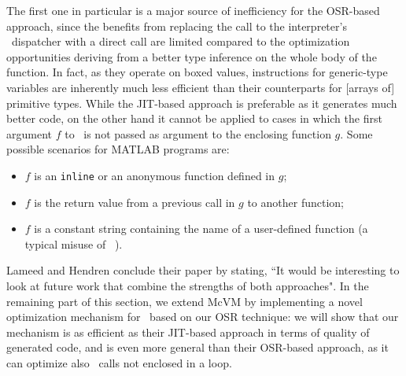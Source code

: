 The first one in particular is a major source of inefficiency for the OSR-based approach, since the benefits from replacing the call to the interpreter's \feval\ dispatcher with a direct call are limited compared to the optimization opportunities deriving from a better type inference on the whole body of the function. In fact, as they operate on boxed values, instructions for generic-type variables are inherently much less efficient than their counterparts for [arrays of] primitive types. While the JIT-based approach is preferable as it generates much better code, on the other hand it cannot be applied to cases in which the first argument $f$ to \feval\ is not passed as argument to the enclosing function $g$. Some possible scenarios for MATLAB programs are:
\begin{itemize}
\item $f$ is an {\tt inline} or an anonymous function defined in $g$;
\item $f$ is the return value from a previous call in $g$ to another function;
\item $f$ is a constant string containing the name of a user-defined function (a typical misuse of \feval ~\cite{radpour2013refactoring}).
\end{itemize}
 
Lameed and Hendren conclude their paper by stating, ``It would be interesting to look at future work that combine the
strengths of both approaches". In the remaining part of this section, we extend McVM by implementing a novel optimization mechanism for \feval\ based on our OSR technique: we will show that our mechanism is as efficient as their JIT-based approach in terms of quality of generated code, and is even more general than their OSR-based approach, as it can optimize also \feval\ calls not enclosed in a loop.
\fi
